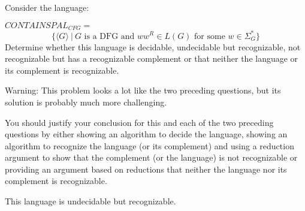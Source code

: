 

Consider the language:

$CONTAINSPAL_{CFG} =$
	\[  \{ \langle G \rangle ~|~ G \mbox{ is a DFG and } ww^R \in L(G) \mbox{ for some } w \in \Sigma_G^* \}
	\]	
	Determine whether this language is decidable, undecidable but recognizable, not recognizable but has a recognizable complement or that neither the language or its complement is recognizable. 
	
	Warning: This problem looks a lot like the two preceding questions, but its solution is probably much more challenging.
	
	You should justify your conclusion for this and
	each of the two preceding questions by either showing an
	algorithm to decide the language, showing an algorithm to recognize the language (or its complement) and using a
	reduction argument to show that the complement (or the language) is not recognizable or providing an argument based
	on reductions that neither the language nor its complement is recognizable.
	
\begin{solution}

This language is undecidable but recognizable.

\end{solution}
